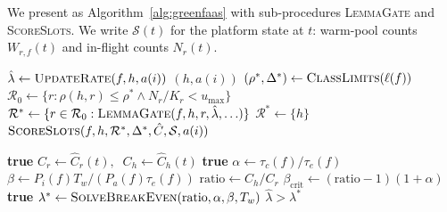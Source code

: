 We present \GreenFaaS{} as Algorithm~\ref{alg:greenfaas} with
sub-procedures \textsc{LemmaGate} and \textsc{ScoreSlots}. We write
$\mathcal{S}(t)$ for the platform state at $t$: warm-pool counts
$W_{r,f}(t)$ and in-flight counts $N_r(t)$.

\begin{algorithm}[t]
\caption{\GreenFaaS$(i, \mathcal{S}, \hat{C})$}
\label{alg:greenfaas}
\begin{algorithmic}[1]
\State $\hat\lambda \gets \textsc{UpdateRate}(f, h, a(i))$
 \Return $(h, a(i))$
\EndIf
\State $(\rho^*, \Delta^*) \gets \textsc{ClassLimits}(\ell(f))$
\State $\mathcal{R}_0 \gets \{r : \rho(h,r) \le \rho^* \wedge N_r/K_r < u_{\max}\}$
\State $\mathcal{R}^* \gets \{r \in \mathcal{R}_0 : \textsc{LemmaGate}(f, h, r, \hat\lambda, \ldots)\}$
 \State $\mathcal{R}^* \gets \{h\}$
\EndIf
\State \Return $\textsc{ScoreSlots}(f, h, \mathcal{R}^*, \Delta^*, \hat{C}, \mathcal{S}, a(i))$
\end{algorithmic}
\end{algorithm}

\begin{algorithm}[t]
\caption{\textsc{LemmaGate}$(f, h, r, \hat\lambda, \mathcal{S}, \hat{C}, t)$}
\label{alg:lemmagate}
\begin{algorithmic}[1]
 \Return \textbf{true}
\EndIf
\State $C_r \gets \hat C_r(t),\;\; C_h \gets \hat C_h(t)$
 \Return \textbf{true} 
\EndIf
\State $\alpha \gets \tau_c(f)/\tau_e(f)$
\State $\beta \gets P_i(f) T_w / (P_a(f)\tau_e(f))$
\State $\mathrm{ratio} \gets C_h / C_r$
\State $\beta_{\mathrm{crit}} \gets (\mathrm{ratio}-1)(1+\alpha)$
 \Return \textbf{true} 
\EndIf
\State $\lambda^* \gets \textsc{SolveBreakEven}(\mathrm{ratio}, \alpha, \beta, T_w)$
\State \Return $\hat\lambda > \lambda^*$
\end{algorithmic}
\end{algorithm}

